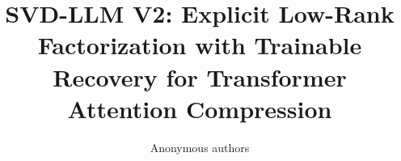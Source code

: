 \title{\textbf{SVD-LLM V2: Explicit Low-Rank Factorization with Trainable Recovery for Transformer Attention Compression}}

\author{Anonymous authors}
